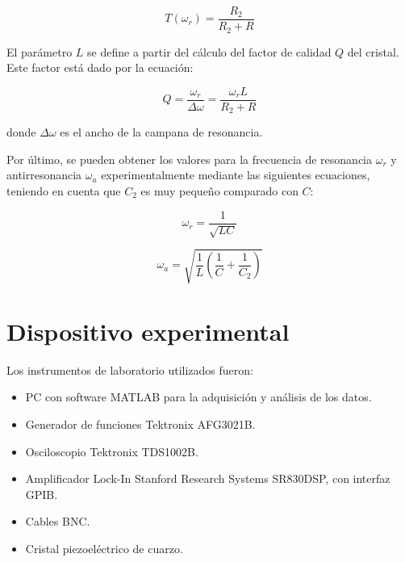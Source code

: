 \documentclass[twoside,twocolumn,a4paper]{article}
\begin{document}
\begin{equation}
\label{eq:transferenciar}
T(\omega_{r}) = \frac{R_{2}}{R_{2} + R}
\end{equation}

\par
El par\'ametro $L$ se define a partir del c\'alculo del factor de calidad  $Q$ del cristal. Este factor est\'a dado por la ecuaci\'on:

\begin{equation}
\label{eq:merito}
Q = \frac{\omega_{r}}{\Delta \omega} = \frac{\omega_{r}L}{R_{2} + R}
\end{equation}

donde $\Delta \omega$ es el ancho de la campana de resonancia. \newline

\par
Por \'ultimo, se pueden obtener los valores para la frecuencia de resonancia $\omega_{r}$ y antirresonancia $\omega_{a}$ experimentalmente mediante las siguientes ecuaciones, teniendo en cuenta que $C_{2}$ es muy peque\~no comparado con $C$:

\begin{equation}
\label{eq:wr}
\omega_{r} = \frac{1}{\sqrt{LC}}
\end{equation}

\begin{equation}
\label{eq:wa}
\omega_{a} = \sqrt{\frac{1}{L}(\frac{1}{C} + \frac{1}{C_{2}})}
\end{equation}


\section{Dispositivo experimental}

Los instrumentos de laboratorio utilizados fueron:
\begin{itemize}
\item 
\label{Laser} PC con software MATLAB para la adquisici\'on y an\'alisis de los datos.
\item Generador de funciones Tektronix AFG3021B.
\item Osciloscopio Tektronix TDS1002B.
\item Amplificador Lock-In Stanford Research Systems SR830DSP, con interfaz GPIB.
\item Cables BNC.
\item Cristal piezoel\'ectrico de cuarzo.
\end{itemize}
\end{document}
